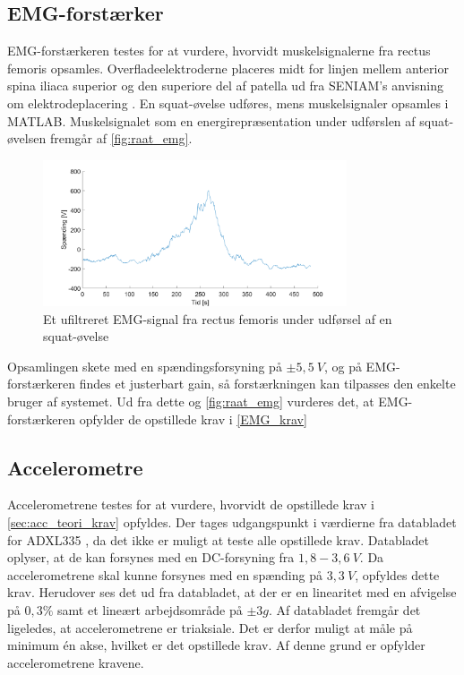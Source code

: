 \subsection{EMG-forstærker}

EMG-forstærkeren testes for at vurdere, hvorvidt muskelsignalerne fra rectus femoris opsamles. Overfladeelektroderne placeres midt for linjen mellem anterior spina iliaca superior og den superiore del af patella ud fra SENIAM's anvisning om elektrodeplacering \citep{seniam2016}. En squat-øvelse udføres, mens muskelsignaler opsamles i MATLAB. Muskelsignalet som en energirepræsentation under udførslen af squat-øvelsen fremgår af \autoref{fig:raat_emg}. 

\begin{figure}[H]
\centering
\includegraphics[width=0.8\textwidth]{figures/raat_EMG_test}
\caption{Et ufiltreret EMG-signal fra rectus femoris under udførsel af en squat-øvelse}
\label{fig:raat_emg}
\end{figure}

Opsamlingen skete med en spændingsforsyning på $\pm5,5~V$, og på EMG-forstærkeren findes et justerbart gain, så forstærkningen kan tilpasses den enkelte bruger af systemet. Ud fra dette og \autoref{fig:raat_emg} vurderes det, at EMG-forstærkeren opfylder de opstillede krav i \autoref{EMG_krav}

\subsection{Accelerometre}

Accelerometrene testes for at vurdere, hvorvidt de opstillede krav i \autoref{sec:acc_teori_krav} opfyldes. Der tages udgangspunkt i værdierne fra databladet for ADXL335 \citep{analogdevices2010}, da det ikke er muligt at teste alle opstillede krav. Databladet oplyser, at de kan forsynes med en DC-forsyning fra $1,8-3,6~V$. Da accelerometrene skal kunne forsynes med en spænding på $3,3~V$, opfyldes dette krav. Herudover ses det ud fra databladet, at der er en linearitet med en afvigelse på $0,3\%$ samt et lineært arbejdsområde på $ \pm 3 g$. Af databladet fremgår det ligeledes, at accelerometrene er triaksiale. Det er derfor muligt at måle på minimum én akse, hvilket er det opstillede krav. Af denne grund er opfylder accelerometrene kravene.  

